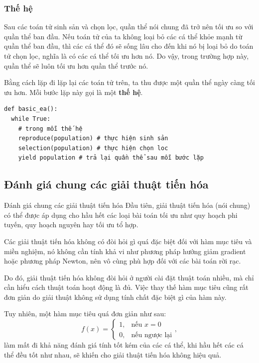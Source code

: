 \begin{frame}[fragile]
\frametitle{Thế hệ}

Sau các toán tử sinh sản và chọn lọc, quần thể nói chung đã trở nên tối ưu so
với quần thể ban đầu. Nếu toán tử của ta không loại bỏ các cá thể khỏe mạnh từ
quần thể ban đầu, thì các cá thể đó sẽ sống lâu cho đến khi nó bị loại bỏ do
toán tử chọn lọc, nghĩa là có các
cá thể tối ưu hơn nó. Do vậy, trong trường hợp này, quần thể sẽ luôn tối ưu hơn
quần thể trước nó.

Bằng cách lặp đi lặp lại các toán tử trên, ta thu được một quần thể ngày càng
tối ưu hơn. Mỗi bước lặp này gọi là một \textbf{thế hệ}.

\begin{verbatim}
def basic_ea():
  while True:
    # trong mỗi thế hệ
    reproduce(population) # thực hiện sinh sản
    selection(population) # thực hiện chọn loc
    yield population # trả lại quần thể sau mỗi bước lặp
\end{verbatim}
\end{frame}


\subsection{Đánh giá chung các giải thuật tiến hóa} %
\label{sub:Đánh giá chung các giải thuật tiến hóa}

\begin{frame}{Đánh giá chung các giải thuật tiến hóa}
Đầu tiên, giải thuật tiến hóa (nói chung) có thể được áp dụng cho hầu hết các loại bài toán tối ưu như quy hoạch phi tuyến, quy hoạch nguyên hay tối ưu tổ hợp.

Các giải thuật tiến hóa không có đòi hỏi gì quá đặc biệt đối với hàm mục tiêu và
miền nghiệm, nó không cần tính khả vi như phương pháp hướng giảm gradient hoặc
phương pháp Newton, nên vô cùng phù hợp đối với các bài toán rời rạc.

Do đó, giải thuật tiến hóa không đòi hỏi ở người cài đặt thuật toán nhiều, mà chỉ
cần hiểu cách thuật toán hoạt động là đủ. Việc thay thế hàm mục tiêu cũng rất
đơn giản do giải thuật không sử dụng tính chất đặc biệt gì của hàm này.

Tuy nhiên, một hàm mục tiêu quá đơn giản như sau:
\[
  f(x) = 
  \begin{cases}
    1, &\text{nếu } x = 0 \\
    0, &\text{nếu ngược lại}
  \end{cases}
,\]  làm mất đi khả năng đánh giá tính tốt kém của các
cá thể, khi hầu hết các cá thể đều tốt như nhau, sẽ khiến cho giải thuật tiến
hóa không hiệu quả.
\end{frame}

